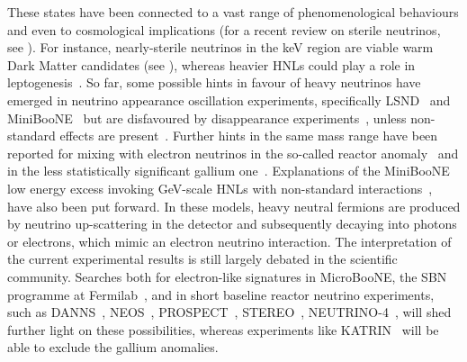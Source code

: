 These states have been connected to a vast range of phenomenological behaviours and %
even to cosmological implications (for a recent review on sterile neutrinos, see \eg {}).
For instance, nearly-sterile neutrinos in the keV region are viable warm Dark Matter candidates (see \eg {}), %
whereas heavier HNLs could play a role in leptogenesis~\cite{Fukugita:1986hr, Covi:1996wh, Pilaftsis:1997jf, Buchmuller:1997yu, %
Pilaftsis:2003gt, Davidson:2008bu, Akhmedov:1998qx, Asaka:2005pn, Hernandez:2015wna, Hernandez:2016kel, %
Hambye:2016sby, Hambye:2017elz, Drewes:2017zyw}.
So far, some possible hints in favour of heavy neutrinos have emerged in neutrino appearance oscillation experiments, %
specifically LSND~\cite{Aguilar:2001ty} and MiniBooNE~\cite{Aguilar-Arevalo:2012fmn, Aguilar-Arevalo:2013pmq, Aguilar-Arevalo:2018gpe} %
but are disfavoured by disappearance experiments~\cite{TheIceCube:2016oqi, Adamson:2017uda, Aartsen:2017bap}, %
unless non-standard effects are present~\cite{Liao:2016reh, Liao:2018mbg, Esmaili:2018qzu, Denton:2018dqq}. Further hints 
in the same mass range have been reported for mixing with electron neutrinos in the so-called reactor anomaly~\cite{Mueller:2011nm, Mention:2011rk, Huber:2011wv, Ko:2016owz, Alekseev:2018efk} and in the less statistically significant gallium one~\cite{Abdurashitov:2005tb, Laveder:2007zz, Giunti:2006bj}.
Explanations of the MiniBooNE low energy excess invoking GeV-scale HNLs with non-standard interactions~\cite{Gninenko:2009ks, Gninenko:2010pr, %
	Masip:2012ke, Bertuzzo:2018itn, Ballett:2018ynz}, %
have also been put forward. In these models, heavy neutral fermions are produced by neutrino up-scattering in the detector and subsequently decaying into photons or electrons, which mimic an electron neutrino interaction.
The interpretation of the current experimental results is still largely debated in the scientific community.
Searches both for electron-like signatures in MicroBooNE, the SBN programme at Fermilab~\cite{Antonello:2015lea}, %
and in short baseline reactor neutrino experiments, such as DANNS~\cite{Alekseev:2018efk}, NEOS~\cite{Ko:2016owz}, %
PROSPECT~\cite{Ashenfelter:2018iov}, STEREO~\cite{Almazan:2018wln}, NEUTRINO-4~\cite{Serebrov:2018vdw}, %
will shed further light on these possibilities, %
whereas experiments like KATRIN~\cite{Mertens:2018vuu} will be able to exclude the gallium anomalies.

